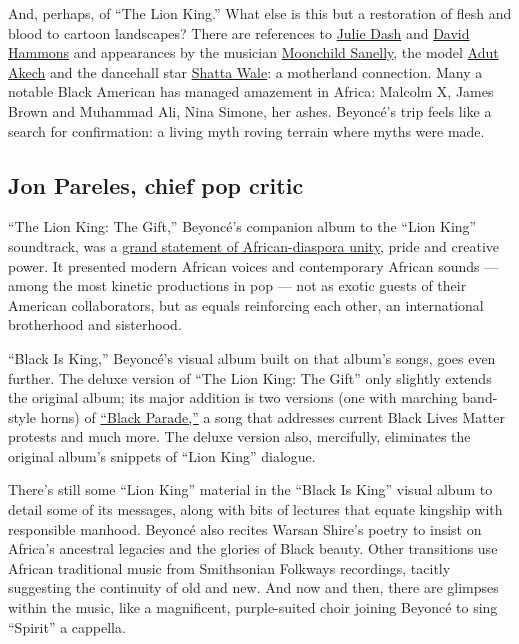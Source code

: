 And, perhaps, of ``The Lion King.'' What else is this but a restoration
of flesh and blood to cartoon landscapes? There are references to
\href{https://www.criterionchannel.com/daughters-of-the-dust}{Julie
Dash} and
\href{https://www.google.com/search?q=African+American+Flag+david+hammons\&client=safari\&rls=en\&sxsrf=ALeKk03IfUCPOgFtGYIYz_4RbNgFsPggpw:1596203835640\&source=lnms\&tbm=isch\&sa=X\&ved=2ahUKEwiX2PLU0vfqAhVsRN8KHVcvAb4Q_AUoAnoECBgQBA\&biw=1694\&bih=957\#imgrc=xTZg8oh2K3EHwM}{David
Hammons} and appearances by the musician
\href{https://www.youtube.com/watch?v=9RBsGd3eXBw}{Moonchild Sanelly},
the model \href{https://www.instagram.com/adutakech/?hl=en}{Adut Akech}
and the dancehall star
\href{https://en.wikipedia.org/wiki/Shatta_Wale}{Shatta Wale}: a
motherland connection. Many a notable Black American has managed
amazement in Africa: Malcolm X, James Brown and Muhammad Ali, Nina
Simone, her ashes. Beyoncé's trip feels like a search for confirmation:
a living myth roving terrain where myths were made.

\hypertarget{jon-pareles-chief-pop-critic}{%
\subsection{Jon Pareles, chief pop
critic}\label{jon-pareles-chief-pop-critic}}

``The Lion King: The Gift,'' Beyoncé's companion album to the ``Lion
King'' soundtrack, was a
\href{https://www.nytimes3xbfgragh.onion/2019/07/24/arts/music/beyonce-the-lion-king-the-gift-review.html}{grand
statement of African-diaspora unity}, pride and creative power. It
presented modern African voices and contemporary African sounds ---
among the most kinetic productions in pop --- not as exotic guests of
their American collaborators, but as equals reinforcing each other, an
international brotherhood and sisterhood.

``Black Is King,'' Beyoncé's visual album built on that album's songs,
goes even further. The deluxe version of ``The Lion King: The Gift''
only slightly extends the original album; its major addition is two
versions (one with marching band-style horns) of
\href{https://www.nytimes3xbfgragh.onion/2020/06/26/arts/music/playlist-beyonce-prince.html}{``Black
Parade,''} a song that addresses current Black Lives Matter protests and
much more. The deluxe version also, mercifully, eliminates the original
album's snippets of ``Lion King'' dialogue.

There's still some ``Lion King'' material in the ``Black Is King''
visual album to detail some of its messages, along with bits of lectures
that equate kingship with responsible manhood. Beyoncé also recites
Warsan Shire's poetry to insist on Africa's ancestral legacies and the
glories of Black beauty. Other transitions use African traditional music
from Smithsonian Folkways recordings, tacitly suggesting the continuity
of old and new. And now and then, there are glimpses within the music,
like a magnificent, purple-suited choir joining Beyoncé to sing
``Spirit'' a cappella.

